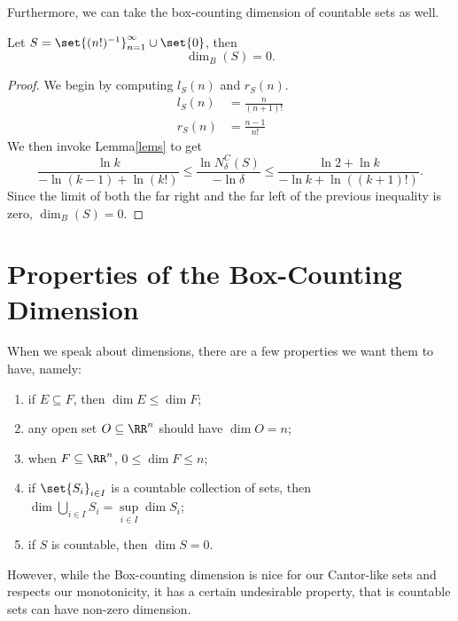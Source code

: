 Furthermore, we can take the box-counting dimension of countable sets as well.

\begin{example}
	Let $S=\set{(n!)^{-1}}_{n=1}^\infty\cup\set{0}$, then
	\[
		\dim_B(S)=0.
	\]
\end{example}
\begin{proof}
	We begin by computing $l_S(n)$ and $r_S(n)$.
	\begin{align*}
		l_S(n) &= \frac{n}{(n+1)!}\\
		r_S(n) &= \frac{n-1}{n!}
	\end{align*}
	We then invoke Lemma\autoref{lems} to get
	\[
		\frac{\ln k}{-\ln (k-1)+\ln(k!)} \leq \frac{\ln N^C_\delta(S)}{-\ln\delta} \leq \frac{\ln 2+\ln k}{-\ln k +\ln ((k+1)!)}.
	\]
	Since the limit of both the far right and the far left of the previous inequality is zero, $\dim_B(S)=0$.
\end{proof}

\section{Properties of the Box-Counting Dimension}

When we speak about dimensions, there are a few properties we want them to have, namely:
\begin{enumerate}
	\item if $E\subseteq F$, then $\dim E\leq\dim F$;
	\item any open set $O\subseteq \RR^n$ should have $\dim O = n$;
	\item when $F\subseteq \RR^n$, $0\leq \dim F\leq n$;
	\item if $\set{S_i}_{i\in I}$ is a countable collection of sets, then $\dim \bigcup_{i\in I} S_i = \sup\limits_{i\in I}\dim S_i$;
	\item if $S$ is countable, then $\dim S=0$.
\end{enumerate}


However, while the Box-counting dimension is nice for our Cantor-like sets and respects our monotonicity, it has a certain undesirable property, that is countable sets can have non-zero dimension.

